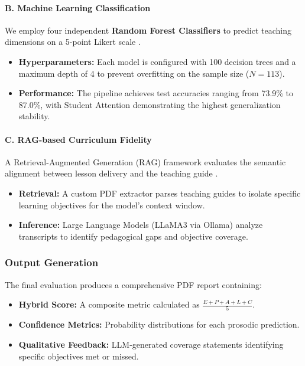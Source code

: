 \paragraph{B. Machine Learning Classification}
We employ four independent \textbf{Random Forest Classifiers} to predict teaching dimensions on a 5-point Likert scale \cite{Breiman2001}.
\begin{itemize}
    \item \textbf{Hyperparameters:} Each model is configured with 100 decision trees and a maximum depth of 4 to prevent overfitting on the sample size ($N=113$).
    \item \textbf{Performance:} The pipeline achieves test accuracies ranging from 73.9\% to 87.0\%, with Student Attention demonstrating the highest generalization stability.
\end{itemize}

\paragraph{C. RAG-based Curriculum Fidelity}
A Retrieval-Augmented Generation (RAG) framework evaluates the semantic alignment between lesson delivery and the teaching guide \cite{Gao2024}.
\begin{itemize}
    \item \textbf{Retrieval:} A custom PDF extractor parses teaching guides to isolate specific learning objectives for the model's context window.
    \item \textbf{Inference:} Large Language Models (LLaMA3 via Ollama) analyze transcripts to identify pedagogical gaps and objective coverage.
\end{itemize}

\subsubsection*{Output Generation}
The final evaluation produces a comprehensive PDF report containing:
\begin{itemize}
    \item \textbf{Hybrid Score:} A composite metric calculated as $\frac{E+P+A+L+C}{5}$.
    \item \textbf{Confidence Metrics:} Probability distributions for each prosodic prediction.
    \item \textbf{Qualitative Feedback:} LLM-generated coverage statements identifying specific objectives met or missed.
\end{itemize}


